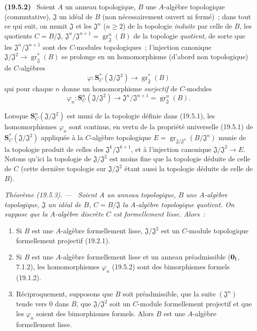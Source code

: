 \documentclass[10pt,oneside]{book}
\makeatletter
\newcommand{\gr}{\operatorname{gr}}
\newcommand{\setmanualcurrentlabel}[1]{\def\@currentlabel{#1}}
\newcommand{\oldpage}[2][]{%
  \setcounter{footnote}{0}%
  \marginpar{\scriptsize\textbf{#1}~|~#2}\ignorespaces}
\newenvironment{env}[1][]{\setmanualcurrentlabel{#1}\par\medskip\noindent\textbf{(#1)}\ }{\par}
\newenvironment{theorem}[1][]{%
  \setmanualcurrentlabel{#1}\par\medskip\noindent\itshape Théorème (#1). ---\ }{\par}
\makeatother
\begin{document}
\begin{env}[19.5.2]
\label{0.19.5.2-fr}
Soient $A$ un anneau topologique, $B$ une $A$-algèbre topologique
(commutative), $\mathfrak J$ un idéal de $B$ (non nécessairement ouvert ni
fermé)~; dans tout ce qui suit, on munit $\mathfrak J$ et les
$\mathfrak J^n$ ($n\geq2$) de la topologie \emph{induite} par celle de $B$,
les quotients $C=B/\mathfrak J$,
$\mathfrak J^n/\mathfrak J^{n+1}=\gr_{\mathfrak J}^n(B)$ de la topologie
\emph{quotient}, de sorte que les $\mathfrak J^n/\mathfrak J^{n+1}$ sont des
$C$-modules topologiques~; l'injection canonique
$\mathfrak J/\mathfrak J^2\to\gr_{\mathfrak J}^*(B)$ se prolonge en un
homomorphisme (d'abord non topologique) de $C$-algèbres
\[
  \varphi:\mathbf S_C^*(\mathfrak J/\mathfrak J^2)
  \longrightarrow\gr_{\mathfrak J}^*(B)
\]
qui pour chaque $n$ donne un homomorphisme \emph{surjectif} de $C$-modules
\begin{equation}
\label{0.19.5.2.1-fr}
  \varphi_n:\mathbf S_C^n(\mathfrak J/\mathfrak J^2)
  \longrightarrow\mathfrak J^n/\mathfrak J^{n+1}
  =\gr_{\mathfrak J}^n(B).
  \tag{19.5.2.1}
\end{equation}

\oldpage[0\textsubscript{IV-1}]{91}

Lorsque $\mathbf S_C^n(\mathfrak J/\mathfrak J^2)$ est muni de la topologie
définie dans (19.5.1), les homomorphismes $\varphi_n$ sont continus, en vertu
de la propriété universelle (19.5.1) de
$\mathbf S_C^*(\mathfrak J/\mathfrak J^2)$ appliquée à la $C$-algèbre
topologique $E=\gr_{\mathfrak J/\mathfrak J^n}(B/\mathfrak J^n)$ munie de la
topologie produit de celles des $\mathfrak J^k/\mathfrak J^{k+1}$, et à
l'injection canonique $\mathfrak J/\mathfrak J^2\to E$. Notons qu'ici la
topologie de $\mathfrak J/\mathfrak J^2$ est moins fine que la topologie
déduite de celle de $C$ (cette dernière topologie sur
$\mathfrak J/\mathfrak J^2$ étant aussi la topologie déduite de celle de $B$).
\end{env}

\begin{theorem}[19.5.3]
\label{0.19.5.3-fr}
Soient $A$ un anneau topologique, $B$ une $A$-algèbre topologique,
$\mathfrak J$ un idéal de $B$, $C=B/\mathfrak J$ la $A$-algèbre topologique
quotient. On suppose que la $A$-algèbre discrète $C$ est formellement lisse.
Alors~:
\begin{enumerate}
  \item[\rm(i)] Si $B$ est une $A$-algèbre formellement lisse,
  $\mathfrak J/\mathfrak J^2$ est un $C$-module topologique formellement
  projectif (19.2.1).
  \item[\rm(ii)] Si $B$ est une $A$-algèbre formellement lisse et un anneau
  préadmissible ($\mathbf 0_{\rm I}$, 7.1.2), les homomorphismes $\varphi_n$
  (19.5.2) sont des bimorphismes formels (19.1.2).
  \item[\rm(iii)] Réciproquement, supposons que $B$ soit préadmissible, que la
  suite $(\mathfrak J^n)$ tende vers $0$ dans $B$, que
  $\mathfrak J/\mathfrak J^2$ soit un $C$-module formellement projectif et que
  les $\varphi_n$ soient des bimorphismes formels. Alors $B$ est une
  $A$-algèbre formellement lisse.
\end{enumerate}
\end{theorem}
\end{document}
